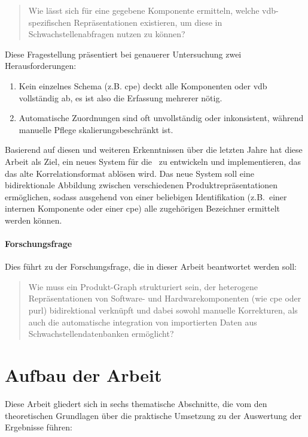 \begin{quote}
    Wie lässt sich für eine gegebene Komponente ermitteln, welche \acrshort{vdb}-spezifischen Repräsentationen existieren, um diese in Schwachstellenabfragen nutzen zu können?
\end{quote}

Diese Fragestellung präsentiert bei genauerer Untersuchung zwei Herausforderungen:

\begin{enumerate}
    \item Kein einzelnes Schema (z.B. \acrshort{cpe}) deckt alle Komponenten oder \acrshort{vdb} vollständig ab, es ist also die Erfassung mehrerer nötig.
    \item Automatische Zuordnungen sind oft unvollständig oder inkonsistent, während manuelle Pflege skalierungsbeschränkt ist.
\end{enumerate}

Basierend auf diesen und weiteren Erkenntnissen über die letzten Jahre hat diese Arbeit als Ziel, ein neues System für die \metaeffekt\  zu entwickeln und implementieren, das das alte Korrelationsformat ablösen wird.
Das neue System soll eine bidirektionale Abbildung zwischen verschiedenen Produktrepräsentationen ermöglichen, sodass ausgehend von einer beliebigen Identifikation (z.B.\ einer internen Komponente oder einer \acrshort{cpe}) alle zugehörigen Bezeichner ermittelt werden können.

\paragraph{Forschungsfrage}

Dies führt zu der Forschungsfrage, die in dieser Arbeit beantwortet werden soll:

\begin{quote}
    Wie muss ein Produkt-Graph strukturiert sein, der heterogene Repräsentationen von Software- und Hardwarekomponenten (wie \acrshort{cpe} oder \acrshort{purl}) bidirektional verknüpft und
    dabei sowohl manuelle Korrekturen, als auch die automatische integration von importierten Daten aus Schwachstellendatenbanken ermöglicht?
\end{quote}


\section{Aufbau der Arbeit}\label{sec:arbeit-aufbau}

Diese Arbeit gliedert sich in sechs thematische Abschnitte, die vom den theoretischen Grundlagen über die praktische Umsetzung zu der Auswertung der Ergebnisse führen:

